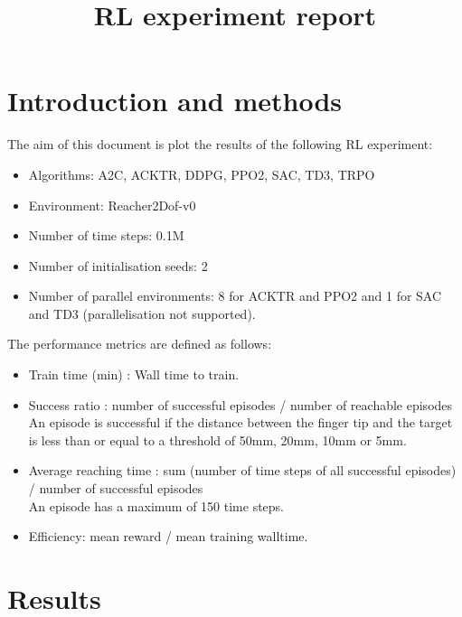 \documentclass{article}
\title{RL experiment report}
\date{}
\begin{document}
\maketitle





\section{Introduction and methods}


The aim of this document is plot the results of the following RL experiment:

\begin{itemize}
  \item Algorithms: A2C, ACKTR, DDPG, PPO2, SAC, TD3, TRPO 
  \item Environment: Reacher2Dof-v0
  \item Number of time steps: 0.1M
  \item Number of initialisation seeds: 2
  \item Number of parallel environments: 8 for ACKTR and PPO2 and 1 for SAC and TD3 (parallelisation not supported).
\end{itemize}


The performance metrics are defined as follows:

\begin{itemize}
  \item Train time (min) : Wall time to train.
  \item Success ratio : number of successful episodes / number of reachable episodes \\ 
An episode is successful if the distance between the finger tip and the target is less than or equal to a threshold of 50mm, 20mm, 10mm or 5mm. \\ 
  \item Average reaching time : sum (number of time steps of all successful episodes) /  number of successful episodes \\ 
An episode has a maximum of 150 time steps.
  \item Efficiency: mean reward / mean training walltime. 
\end{itemize}



\section{Results}
\end{document}
